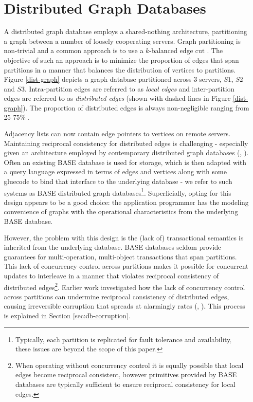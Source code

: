 \section{Distributed Graph Databases}
\label{sec:distr-graph-datab}

A distributed graph database employs a shared-nothing architecture, partitioning a graph between a number of loosely cooperating servers.
Graph partitioning is non-trivial and a common approach is to use a $k$-balanced edge cut \cite{Huang2016}.
The objective of such an approach is to minimize the proportion of edges that span partitions in a manner that balances the distribution of vertices to partitions.
Figure \ref{dist-graph} depicts a graph database partitioned across 3 servers, $S1$, $S2$ and $S3$.
Intra-partition edges are referred to as \textit{local edges} and inter-partition edges are referred to as \textit{distributed edges} (shown with dashed lines in Figure \ref{dist-graph}).
The proportion of distributed edges is always non-negligible ranging from 25-75\% \cite{Huang2016}.



Adjacency lists can now contain edge pointers to vertices on remote servers. Maintaining reciprocal consistency for distributed edges is challenging - especially given an architecture employed by contemporary distributed graph databases (\cite{janusgraph}, \cite{TitanDB}). Often an existing BASE database is used for storage, which is then adapted with a query language expressed in terms of edges and vertices along with some gluecode to bind that interface to the underlying database - we refer to such systems as BASE distributed graph databases\footnote{Typically, each partition is replicated for fault tolerance and availability, these issues are beyond the scope of this paper.}. Superficially, opting for this design appears to be a good choice: the application programmer has the modeling convenience of graphs with the operational characteristics from the underlying BASE database.

However, the problem with this design is the (lack of) transactional semantics is inherited from the underlying database. BASE databases seldom provide guarantees for multi-operation, multi-object transactions that span partitions. This lack of concurrency control across partitions makes it possible for concurrent updates to interleave in a manner that violates reciprocal consistency of distributed edges\footnote{When operating without concurrency control it is equally possible that local edges become reciprocal consistent, however primitives provided by BASE databases are typically sufficient to ensure reciprocal consistency for local edges.}. Earlier work investigated how the lack of concurrency control across partitions can undermine reciprocal consistency of distributed edges, causing irreversible corruption that spreads at alarmingly rates (\cite{Ezhilchelvan2018}, \cite{Webber2019}). This process is explained in Section \ref{sec:db-corruption}.


